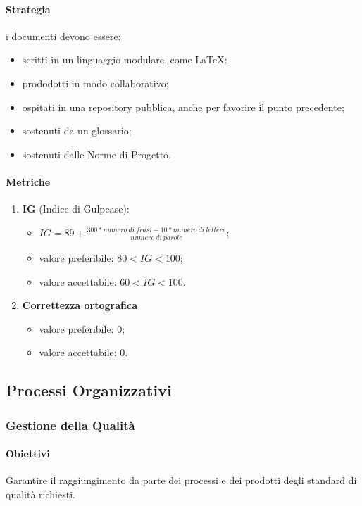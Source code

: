         \paragraph{Strategia} i documenti devono essere:
            \begin{itemize}
                \item scritti in un linguaggio modulare, come \LaTeX;
                \item prododotti in modo collaborativo;
                \item ospitati in una repository pubblica, anche per favorire il punto precedente;
                \item sostenuti da un glossario;
                \item sostenuti dalle Norme di Progetto.
            \end{itemize}
        \paragraph{Metriche}
        \begin{enumerate}
            \item \textbf{IG} (Indice di Gulpease):
            \begin{itemize}
                \item $IG = 89+\frac{300*numero\ di\ frasi-10*numero\ di\ lettere}{numero\ di\ parole}$;
                \item valore preferibile: $80< IG < 100$;
                \item valore accettabile: $60< IG < 100$.
            \end{itemize}
            \item \textbf{Correttezza ortografica}
            \begin{itemize}
                \item valore preferibile: $0$;
                \item valore accettabile: $0$.
            \end{itemize}
        \end{enumerate}
\subsection{Processi Organizzativi}
    \subsubsection{Gestione della Qualità}
        \paragraph{Obiettivi}
            Garantire il raggiungimento da parte dei processi e dei prodotti degli standard di qualità richiesti.
